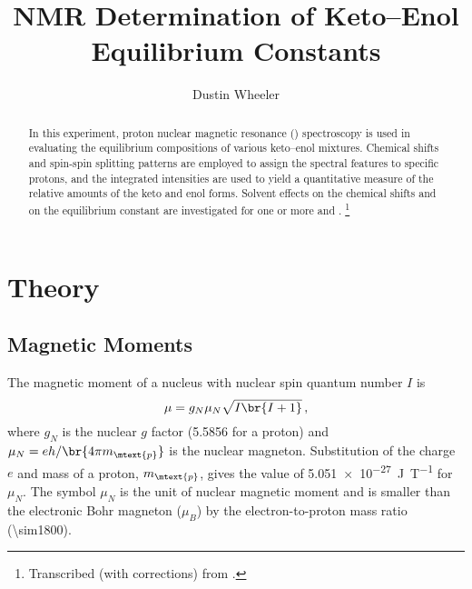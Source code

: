 \documentclass[nobib,nofonts,nols,nohyper,draft]{tufte-handout}
\title{NMR Determination of Keto--Enol Equilibrium Constants}
\author{Dustin Wheeler}
\begin{document}
\maketitle%

\begin{abstract}
\noindent
In this experiment, proton nuclear magnetic resonance (\NMR*) spectroscopy is used in evaluating the equilibrium compositions of various keto--enol mixtures. 
Chemical shifts and spin-spin splitting patterns are employed to assign the spectral features to specific protons, and the integrated intensities are used to yield a quantitative measure of the relative amounts of the keto and enol forms. 
Solvent effects on the chemical shifts and on the equilibrium constant are investigated for one or more  and . 
\thanks{Transcribed (with corrections) from \textcite{nibler14}.}
\end{abstract}


\section{Theory} %
\label{sec:theory}

\subsection{Magnetic Moments} %
\label{sub:magnetic_moments}

%    
The magnetic moment of a nucleus with nuclear spin quantum number \( I \) is 
\begin{equation}
	\mu = g_N \mu_N \sqrt{I \br{I+1}} \, ,
	\label{eq:mag_mom}
\end{equation}
where \( g_N \) is the nuclear \( g \) factor (\num{5.5856} for a proton) and \( \mu_N = e h / \br{4 \pi m_\mtext{p}} \) is the nuclear magneton.
Substitution of the charge \( e \) and mass of a proton, \( m_\mtext{p} \), gives the value of \SI{5.051e-27}{\joule\per\tesla} for \( \mu_N \). 
The symbol \( \mu_N \) is the unit of nuclear magnetic moment and is smaller than the electronic Bohr magneton (\( \mu_B \)) by the electron-to-proton mass ratio (\num{\sim1800}). 
\end{document}
